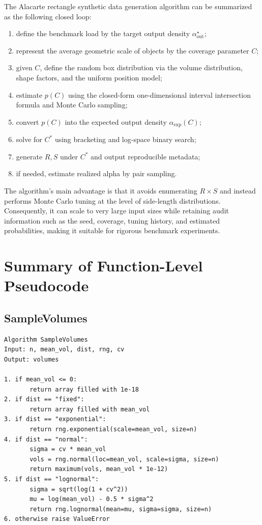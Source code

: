 \documentclass[11pt,a4paper]{article}
\begin{document}
The Alacarte rectangle synthetic data generation algorithm can be summarized as the following closed loop:
\begin{enumerate}
  \item define the benchmark load by the target output density $\alpha_{\mathrm{out}}^\star$;
  \item represent the average geometric scale of objects by the coverage parameter $C$;
  \item given $C$, define the random box distribution via the volume distribution, shape factors, and the uniform position model;
  \item estimate $p(C)$ using the closed-form one-dimensional interval intersection formula and Monte Carlo sampling;
  \item convert $p(C)$ into the expected output density $\alpha_{\mathrm{exp}}(C)$;
  \item solve for $C^*$ using bracketing and log-space binary search;
  \item generate $R,S$ under $C^*$ and output reproducible metadata;
  \item if needed, estimate realized alpha by pair sampling.
\end{enumerate}

The algorithm's main advantage is that it avoids enumerating $R\times S$ and instead performs Monte Carlo tuning at the level of side-length distributions. Consequently, it can scale to very large input sizes while retaining audit information such as the seed, coverage, tuning history, and estimated probabilities, making it suitable for rigorous benchmark experiments.

\appendix

\section{Summary of Function-Level Pseudocode}

\subsection{SampleVolumes}

\begin{verbatim}
Algorithm SampleVolumes
Input: n, mean_vol, dist, rng, cv
Output: volumes

1. if mean_vol <= 0:
       return array filled with 1e-18
2. if dist == "fixed":
       return array filled with mean_vol
3. if dist == "exponential":
       return rng.exponential(scale=mean_vol, size=n)
4. if dist == "normal":
       sigma = cv * mean_vol
       vols = rng.normal(loc=mean_vol, scale=sigma, size=n)
       return maximum(vols, mean_vol * 1e-12)
5. if dist == "lognormal":
       sigma = sqrt(log(1 + cv^2))
       mu = log(mean_vol) - 0.5 * sigma^2
       return rng.lognormal(mean=mu, sigma=sigma, size=n)
6. otherwise raise ValueError
\end{verbatim}
\end{document}
